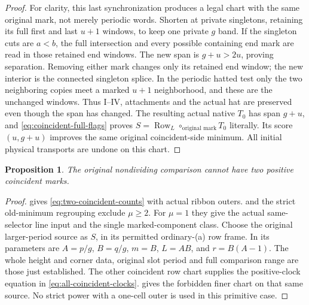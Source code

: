\documentclass[11pt,a4paper]{amsart}
\numberwithin{equation}{section}
\theoremstyle{plain}
\newtheorem{proposition}[theorem]{Proposition}
\theoremstyle{definition}
\newcommand{\Row}{\operatorname{Row}}
\begin{document}
\begin{proof}
For clarity, this last synchronization produces a legal chart with the
same original mark, not merely periodic words.  Shorten at private
singletons, retaining its full first and last \(u+1\) windows, to keep one
private \(g\) band.  If the singleton cuts are \(a<b\), the full intersection
and every possible containing end mark are read in those retained end
windows.  The new span is \(g+u>2u\), proving separation.  Removing either
mark changes only its retained end window; the new interior is the
connected singleton splice.  In the periodic hatted test only the two
neighboring copies meet a marked \(u+1\) neighborhood, and these are the
unchanged windows.  Thus I--IV, attachments and the actual hat are
preserved even though the span has changed.  The resulting actual native
\(T_0\) has span \(g+u\), and \eqref{eq:coincident-full-flags} proves
\(S=\Row_L\circ_{\text{original mark}}T_0\) literally.
Its score \((u,g+u)\) improves the same original coincident-side minimum.
All initial physical transports are undone on this chart.
\end{proof}

\begin{proposition}\label{prop:two-coincident}
The original nondividing comparison cannot have two positive coincident
marks.
\end{proposition}
\begin{proof}
 gives \eqref{eq:two-coincident-counts} with
actual ribbon outers.   and the strict old-minimum
regrouping exclude \(\mu\ge2\).  For \(\mu=1\) they give the actual
same-selector line input and the single marked-component class.
Choose the original larger-period source as \(S\), in its permitted
ordinary-(a) row frame.  In  its parameters
are \(A=p/g\), \(B=q/g\), \(m=B\), \(L=AB\), and \(r=B(A-1)\).
The whole height and corner data, original slot period and full
comparison range are those just established.  The other coincident row
chart supplies the positive-clock equation in
\eqref{eq:all-coincident-clocks}.   gives the
forbidden finer chart on that same source.  No strict power with a
one-cell outer is used in this primitive case.
\end{proof}
\end{document}
